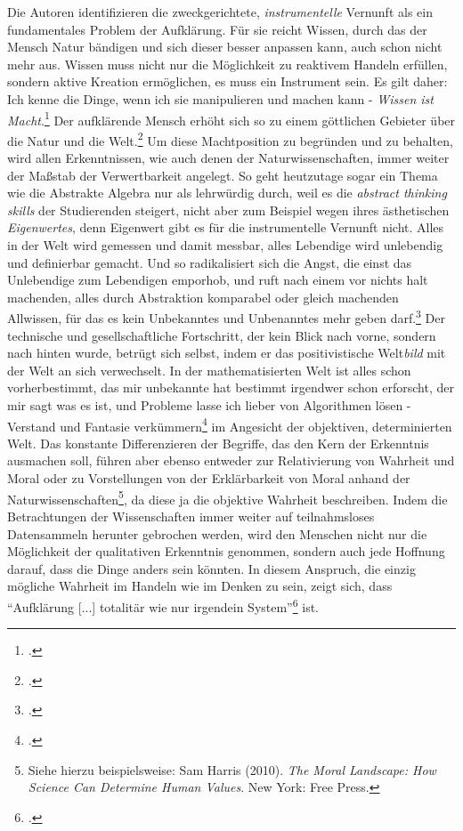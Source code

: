 \documentclass[a4paper, 12pt]{article}
\begin{document}
\begin{onehalfspace}
Die Autoren identifizieren die zweckgerichtete, \emph{instrumentelle} Vernunft als ein fundamentales Problem der Aufklärung. Für sie reicht Wissen, durch das der Mensch Natur bändigen und sich dieser besser anpassen kann, auch schon nicht mehr aus. Wissen muss nicht nur die Möglichkeit zu reaktivem Handeln erfüllen, sondern aktive Kreation ermöglichen, es muss ein Instrument sein. Es gilt daher: Ich kenne die Dinge, wenn ich sie manipulieren und machen kann - \emph{Wissen ist Macht}.\footnote{\Cite[Vgl.][S. 15]{dialektik-der-aufklaerung}.} Der aufklärende Mensch erhöht sich so zu einem göttlichen Gebieter über die Natur und die Welt.\footnote{\Cite[Vgl.][S. 15]{dialektik-der-aufklaerung}.} Um diese Machtposition zu begründen und zu behalten, wird allen Erkenntnissen, wie auch denen der Naturwissenschaften, immer weiter der Maßstab der Verwertbarkeit angelegt. So geht heutzutage sogar ein Thema wie die Abstrakte Algebra nur als lehrwürdig durch, weil es die \emph{abstract thinking skills} der Studierenden steigert, nicht aber zum Beispiel wegen ihres ästhetischen \emph{Eigenwertes}, denn Eigenwert gibt es für die instrumentelle Vernunft nicht. Alles in der Welt wird gemessen und damit messbar, alles Lebendige wird unlebendig und definierbar gemacht. Und so radikalisiert sich die Angst, die einst das Unlebendige zum Lebendigen emporhob, und ruft nach einem vor nichts halt machenden, alles durch Abstraktion komparabel oder gleich machenden Allwissen, für das es kein Unbekanntes und Unbenanntes mehr geben darf.\footnote{\Cite[Vgl.][S. 22 f.]{dialektik-der-aufklaerung}.} Der technische und gesellschaftliche Fortschritt, der kein Blick nach vorne, sondern nach hinten wurde, betrügt sich selbst, indem er das positivistische Welt\emph{bild} mit der Welt an sich verwechselt. In der mathematisierten Welt ist alles schon vorherbestimmt, das mir unbekannte hat bestimmt irgendwer schon erforscht, der mir sagt was es ist, und Probleme lasse ich lieber von Algorithmen lösen - Verstand und Fantasie verkümmern\footnote{\Cite[Vgl.][S. 42]{dialektik-der-aufklaerung}.} im Angesicht der objektiven, determinierten Welt. Das konstante Differenzieren der Begriffe, das den Kern der Erkenntnis ausmachen soll, führen aber ebenso entweder zur Relativierung von Wahrheit und Moral oder zu Vorstellungen von der Erklärbarkeit von Moral anhand der Naturwissenschaften\footnote{Siehe hierzu beispielsweise: Sam Harris (2010). \emph{The Moral Landscape: How Science Can Determine Human Values}. New York: Free Press.}, da diese ja die objektive Wahrheit beschreiben. Indem die Betrachtungen der Wissenschaften immer weiter auf teilnahmsloses Datensammeln herunter gebrochen werden, wird den Menschen nicht nur die Möglichkeit der qualitativen Erkenntnis genommen, sondern auch jede Hoffnung darauf, dass die Dinge anders sein könnten. In diesem Anspruch, die einzig mögliche Wahrheit im Handeln wie im Denken zu sein, zeigt sich, dass "`Aufklärung [...] totalitär wie nur irgendein System"'\footnote{\Cite[Siehe][S. 31]{dialektik-der-aufklaerung}.} ist. 


\end{onehalfspace}
\end{document}
